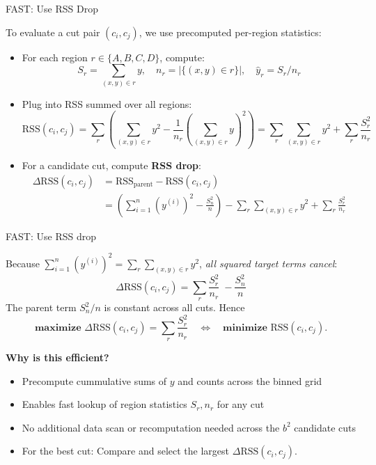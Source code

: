 \documentclass[10pt,compress,t,notes=noshow, xcolor=table]{beamer}
\begin{document}
\begin{frame}{FAST: Use RSS Drop}
\small

To evaluate a cut pair $(c_i, c_j)$, we use precomputed per-region statistics:

\begin{itemize}
  \item For each region $r \in \{A, B, C, D\}$, compute:
    \[
    S_r = \sum_{(x,y)\in r} y,\quad
    n_r = |\{(x,y)\in r\}|,\quad
    \hat y_r = S_r / n_r
    \]
  \item Plug into RSS summed over all regions: $$
\text{RSS}(c_i, c_j) = \sum_{r} \left( \sum_{(x,y) \in r} y^2 - \frac{1}{n_r} \left(\sum_{(x,y) \in r} y \right)^2 \right) = 
\sum_{r}\sum_{(x,y)\in r} y^2+\sum_{r}\frac{S_r^{2}}{n_r}
$$
  \item 
For a candidate cut, compute \textbf{RSS drop}:
\begin{align*}
  \Delta\text{RSS}(c_i,c_j)
     &=\text{RSS}_{\text{parent}}-\text{RSS}(c_i,c_j)\\
     &=\left(\sum_{i = 1}^n \left(y^{(i)}\right)^{2} -\frac{S_n^{2}}{n}\right)
       -  \sum_{r}\sum_{(x,y)\in r} y^2+\sum_{r}\frac{S_r^{2}}{n_r}
\end{align*}
\end{itemize}


\end{frame}
\begin{frame}{FAST: Use RSS drop}

Because $\sum_{i = 1}^n \left(y^{(i)}\right) ^{2} = \sum_{r}\sum_{(x,y)\in r} y^2$, \emph{all squared target terms cancel}:
\[
  \boxed{\displaystyle
  \Delta\text{RSS}(c_i,c_j)
     =\sum_{r}\frac{S_r^{2}}{n_r}\;-
      \frac{S_n^{2}}{n}}
\]
The parent term $S_n^{2}/n$ is constant across all cuts.  Hence
\[
  \textbf{maximize }\Delta\text{RSS}(c_i,c_j)=\sum_{r}\frac{S_r^{2}}{n_r}
  \quad\Longleftrightarrow\quad
  \textbf{minimize }\text{RSS}(c_i,c_j).
\]


\textbf{Why is this efficient?}
\begin{itemize}
  \item Precompute cummulative sums of \(y\) and counts across the binned grid
  \item Enables fast lookup of region statistics \(S_r, n_r\) for any cut
  \item No additional data scan or recomputation needed across the \(b^2\) candidate cuts
  \item For the best cut: Compare and select the largest
$\Delta\text{RSS}(c_i,c_j)$.
\end{itemize}


\end{frame}
\end{document}
